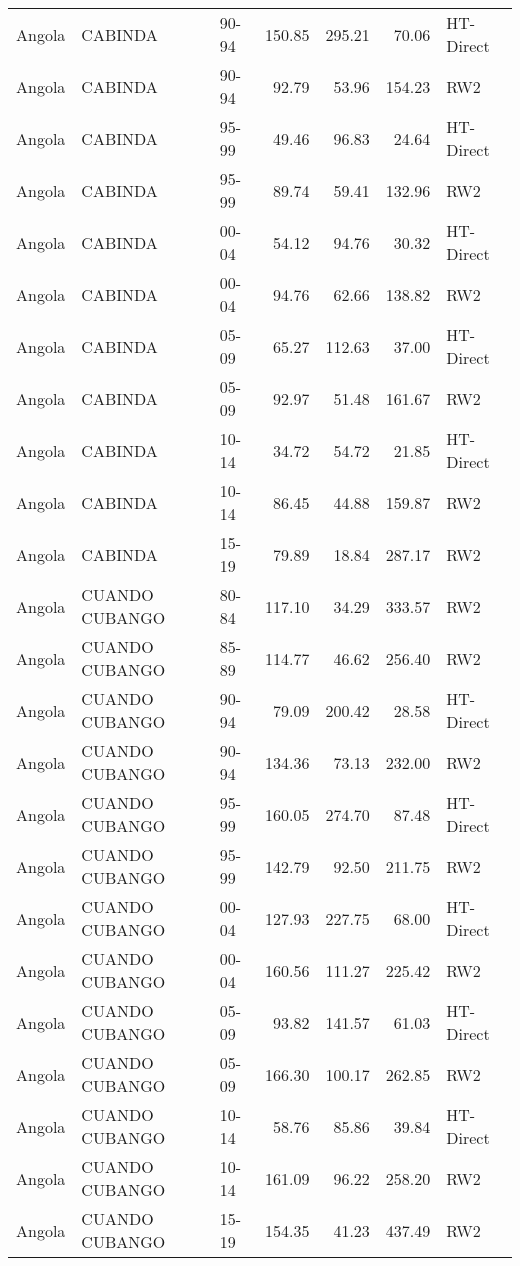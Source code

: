 \begin{longtable}{lllrrrl}
  Angola & CABINDA & 90-94 & 150.85 & 295.21 & 70.06 & HT-Direct \\ 
  Angola & CABINDA & 90-94 & 92.79 & 53.96 & 154.23 & RW2 \\ 
  Angola & CABINDA & 95-99 & 49.46 & 96.83 & 24.64 & HT-Direct \\ 
  Angola & CABINDA & 95-99 & 89.74 & 59.41 & 132.96 & RW2 \\ 
  Angola & CABINDA & 00-04 & 54.12 & 94.76 & 30.32 & HT-Direct \\ 
  Angola & CABINDA & 00-04 & 94.76 & 62.66 & 138.82 & RW2 \\ 
  Angola & CABINDA & 05-09 & 65.27 & 112.63 & 37.00 & HT-Direct \\ 
  Angola & CABINDA & 05-09 & 92.97 & 51.48 & 161.67 & RW2 \\ 
  Angola & CABINDA & 10-14 & 34.72 & 54.72 & 21.85 & HT-Direct \\ 
  Angola & CABINDA & 10-14 & 86.45 & 44.88 & 159.87 & RW2 \\ 
  Angola & CABINDA & 15-19 & 79.89 & 18.84 & 287.17 & RW2 \\ 
  Angola & CUANDO CUBANGO & 80-84 & 117.10 & 34.29 & 333.57 & RW2 \\ 
  Angola & CUANDO CUBANGO & 85-89 & 114.77 & 46.62 & 256.40 & RW2 \\ 
  Angola & CUANDO CUBANGO & 90-94 & 79.09 & 200.42 & 28.58 & HT-Direct \\ 
  Angola & CUANDO CUBANGO & 90-94 & 134.36 & 73.13 & 232.00 & RW2 \\ 
  Angola & CUANDO CUBANGO & 95-99 & 160.05 & 274.70 & 87.48 & HT-Direct \\ 
  Angola & CUANDO CUBANGO & 95-99 & 142.79 & 92.50 & 211.75 & RW2 \\ 
  Angola & CUANDO CUBANGO & 00-04 & 127.93 & 227.75 & 68.00 & HT-Direct \\ 
  Angola & CUANDO CUBANGO & 00-04 & 160.56 & 111.27 & 225.42 & RW2 \\ 
  Angola & CUANDO CUBANGO & 05-09 & 93.82 & 141.57 & 61.03 & HT-Direct \\ 
  Angola & CUANDO CUBANGO & 05-09 & 166.30 & 100.17 & 262.85 & RW2 \\ 
  Angola & CUANDO CUBANGO & 10-14 & 58.76 & 85.86 & 39.84 & HT-Direct \\ 
  Angola & CUANDO CUBANGO & 10-14 & 161.09 & 96.22 & 258.20 & RW2 \\ 
  Angola & CUANDO CUBANGO & 15-19 & 154.35 & 41.23 & 437.49 & RW2 \\ 

\end{longtable}
